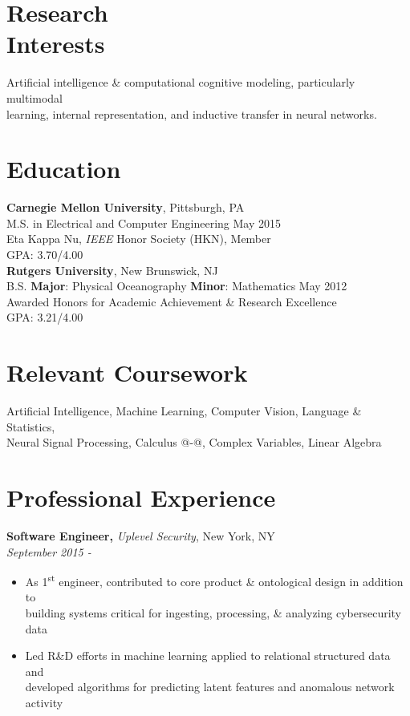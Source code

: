 \documentclass[margin]{res}
\makeatletter
\newcommand*{\rom}[1]{\expandafter\@slowromancap\romannumeral #1@}
\makeatother
\begin{document}
\begin{resume}

\section{Research \\ Interests}
Artificial intelligence \& computational cognitive modeling, particularly multimodal \\ learning, internal representation,  and inductive transfer in neural networks.


\section{Education}
\textbf{Carnegie Mellon University}, Pittsburgh, PA\\
M.S. in Electrical and Computer Engineering \hfill May 2015\\
Eta Kappa Nu, \emph{IEEE} Honor Society (HKN), Member \\
GPA: 3.70/4.00 \vspace{5pt}\\
\textbf{Rutgers University}, New Brunswick, NJ\\
B.S. \textbf{Major}: Physical Oceanography \textbf{Minor}: Mathematics  \hfill May 2012\\
Awarded Honors for Academic Achievement \& Research Excellence\\
GPA: 3.21/4.00
\vspace{-10pt}

\section{Relevant Coursework}
Artificial Intelligence, Machine Learning, Computer Vision, Language \& Statistics, \\
Neural Signal Processing, Calculus \rom{1}-\rom{5}, Complex Variables, Linear Algebra


\section{Professional Experience}
{\bf Software Engineer,} \emph{Uplevel Security}, New York, NY\\
\hfill \emph{September 2015 - }
\begin{itemize} \itemsep -2pt
\item As 1\textsuperscript{st} engineer, contributed to core product \& ontological design in addition to \\ building systems critical for ingesting, processing, \& analyzing cybersecurity data
\item Led R\&D efforts in machine learning applied to relational structured data and \\
developed algorithms for predicting latent features and anomalous network activity
\end{itemize}
\vspace{-10pt}


\end{resume}
\end{document}

